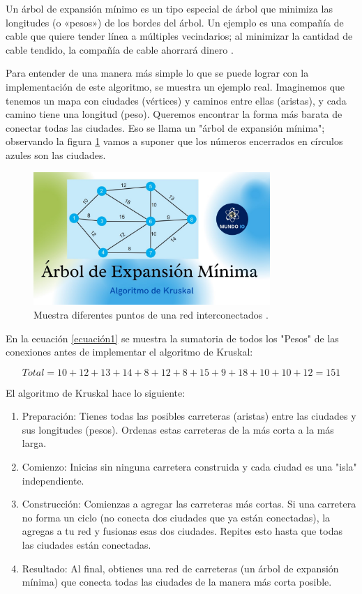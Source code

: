 \documentclass[12pt,a4paper]{article}
\begin{document}
Un árbol de expansión mínimo es un tipo especial de árbol que minimiza las longitudes (o «pesos») de los bordes del árbol. Un ejemplo es una compañía de cable que quiere tender línea a múltiples vecindarios; al minimizar la cantidad de cable tendido, la compañía de cable ahorrará dinero \cite{arbol}.

Para entender de una manera más simple lo que se puede lograr con la implementación de este algoritmo, se muestra un ejemplo real.
Imaginemos que tenemos un mapa con ciudades (vértices) y caminos entre ellas (aristas), y cada camino tiene una longitud (peso). Queremos encontrar la forma más barata de conectar todas las ciudades. Eso se llama un "árbol de expansión mínima"; observando la figura \ref{fig:ejemplo1} vamos a suponer que los números encerrados en círculos azules son las ciudades.

\begin{figure}[h!]
\centering
\includegraphics[width=0.8\textwidth]{Ejemplo1.jpg}
\caption{\label{fig:ejemplo1}Muestra diferentes puntos de una red interconectados \cite{ImagenEjemplo}.}
\end{figure}

En la ecuación \ref{ecuación1} se muestra la sumatoria de todos los "Pesos" de las conexiones antes de implementar el algoritmo de Kruskal:

\begin{equation}
\label{ecuación1}
    Total = 10+12+13+14+8+12+8+15+9+18+10+10+12 = 151
\end{equation}

El algoritmo de Kruskal hace lo siguiente:

\begin{enumerate}
    \item Preparación: Tienes todas las posibles carreteras (aristas) entre las ciudades y sus longitudes (pesos). Ordenas estas carreteras de la más corta a la más larga.
    \item Comienzo: Inicias sin ninguna carretera construida y cada ciudad es una "isla" independiente.
    \item Construcción: Comienzas a agregar las carreteras más cortas. Si una carretera no forma un ciclo (no conecta dos ciudades que ya están conectadas), la agregas a tu red y fusionas esas dos ciudades. Repites esto hasta que todas las ciudades están conectadas.
    \item Resultado: Al final, obtienes una red de carreteras (un árbol de expansión mínima) que conecta todas las ciudades de la manera más corta posible.
\end{enumerate}
\end{document}
